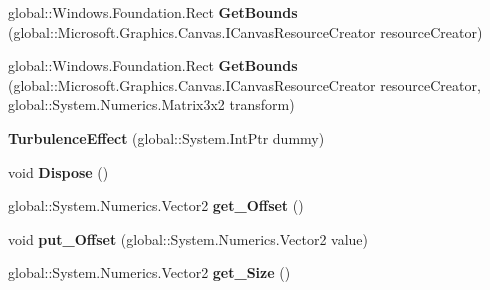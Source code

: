 \begin{DoxyCompactItemize}
global\+::\+Windows.\+Foundation.\+Rect {\bfseries Get\+Bounds} (global\+::\+Microsoft.\+Graphics.\+Canvas.\+I\+Canvas\+Resource\+Creator resource\+Creator)
\item 
\mbox{\label{class_microsoft_1_1_graphics_1_1_canvas_1_1_effects_1_1_turbulence_effect_a3a6ab674e0ac6ee842030f2a1f7c0ad4}} 
global\+::\+Windows.\+Foundation.\+Rect {\bfseries Get\+Bounds} (global\+::\+Microsoft.\+Graphics.\+Canvas.\+I\+Canvas\+Resource\+Creator resource\+Creator, global\+::\+System.\+Numerics.\+Matrix3x2 transform)
\item 
\mbox{\label{class_microsoft_1_1_graphics_1_1_canvas_1_1_effects_1_1_turbulence_effect_a7138fc554faf8edbe9dd225b0d269fa1}} 
{\bfseries Turbulence\+Effect} (global\+::\+System.\+Int\+Ptr dummy)
\item 
\mbox{\label{class_microsoft_1_1_graphics_1_1_canvas_1_1_effects_1_1_turbulence_effect_a8b22105827e76c8c48ec956365234137}} 
void {\bfseries Dispose} ()
\item 
\mbox{\label{class_microsoft_1_1_graphics_1_1_canvas_1_1_effects_1_1_turbulence_effect_a1f221cd27052403cf998ee30e9b25788}} 
global\+::\+System.\+Numerics.\+Vector2 {\bfseries get\+\_\+\+Offset} ()
\item 
\mbox{\label{class_microsoft_1_1_graphics_1_1_canvas_1_1_effects_1_1_turbulence_effect_af1bf86f6255767db3f111cbb6184b538}} 
void {\bfseries put\+\_\+\+Offset} (global\+::\+System.\+Numerics.\+Vector2 value)
\item 
\mbox{\label{class_microsoft_1_1_graphics_1_1_canvas_1_1_effects_1_1_turbulence_effect_aa580c66268151da75c5bb1dcd70e6713}} 
global\+::\+System.\+Numerics.\+Vector2 {\bfseries get\+\_\+\+Size} ()
\item 
\mbox{\label{class_microsoft_1_1_graphics_1_1_canvas_1_1_effects_1_1_turbulence_effect_a47a7d02ed887f4eda944c18f504a4f45}} 

\end{DoxyCompactItemize}
